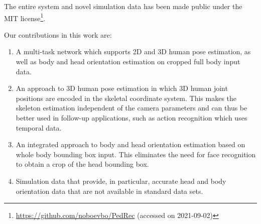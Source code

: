 \documentclass[a4paper, 10pt, conference]{ieeeconf}
\begin{document}
The entire system and novel simulation data has been made public under the MIT license\footnote{\url{https://github.com/noboevbo/PedRec} (accessed on 2021-09-02)}.

Our contributions in this work are:

\begin{enumerate}
\item A multi-task network which supports 2D and 3D human pose estimation, as well as body and head orientation estimation on cropped full body input data.
\item An approach to 3D human pose estimation in which 3D human joint positions are encoded in the skeletal coordinate system. This makes the skeleton estimation independent of the camera parameters and can thus be better used in follow-up applications, such as action recognition which uses temporal data.
\item An integrated approach to body and head orientation estimation based on whole body bounding box input. This eliminates the need for face recognition to obtain a crop of the head bounding box.
\item Simulation data that provide, in particular, accurate head and body orientation data that are not available in standard data sets.
\end{enumerate}
\end{document}
